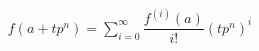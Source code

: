 \documentclass[preview]{standalone}
\begin{document}
\begin{align*}
f(a+tp^n) = \sum_{i=0}^{\infty}\dfrac{f^{(i)}(a)}{i!}(tp^n)^i
\end{align*}
\end{document}
